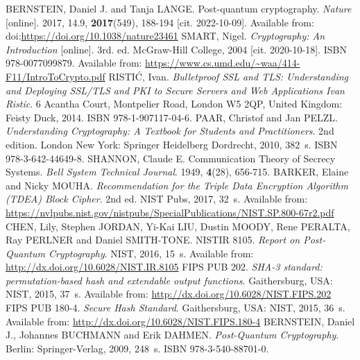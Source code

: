 

\begin{thebibliography}{99}
  BERNSTEIN, Daniel J. and Tanja LANGE. Post-quantum cryptography. \textit{Nature} [online]. 2017, 14.9, \textbf{2017}(549), 188-194 [cit. 2022-10-09]. Available from: doi:\url{https://doi.org/10.1038/nature23461}
  SMART, Nigel. \textit{Cryptography: An Introduction} [online]. 3rd. ed. McGraw-Hill College, 2004 [cit. 2020-10-18]. ISBN 978-0077099879. Available from: \url{https://www.cs.umd.edu/~waa/414-F11/IntroToCrypto.pdf}
  RISTIĆ, Ivan. \textit{Bulletproof SSL and TLS: Understanding and Deploying SSL/TLS and PKI to Secure Servers and Web Applications Ivan Ristic}. 6 Acantha Court, Montpelier Road, London W5 2QP, United Kingdom: Feisty Duck, 2014. ISBN 978-1-907117-04-6.
  PAAR, Christof and Jan PELZL. \textit{Understanding Cryptography: A Textbook for Students and Practitioners}. 2nd edition. London New York: Springer Heidelberg Dordrecht, 2010, 382~s. ISBN 978-3-642-44649-8.
  SHANNON, Claude E. Communication Theory of Secrecy Systems. \textit{Bell System Technical Journal}. 1949, \textbf{4}(28), 656-715.
  BARKER, Elaine and Nicky MOUHA. \textit{Recommendation for the Triple Data Encryption Algorithm (TDEA) Block Cipher}. 2nd ed. NIST Pubs, 2017, 32~s. Available from: \url{https://nvlpubs.nist.gov/nistpubs/SpecialPublications/NIST.SP.800-67r2.pdf}
  CHEN, Lily, Stephen JORDAN, Yi-Kai LIU, Dustin MOODY, Rene PERALTA, Ray PERLNER and Daniel SMITH-TONE. NISTIR 8105. \textit{Report on Post-Quantum Cryptography}. NIST, 2016, 15~s. Available from: \url{http://dx.doi.org/10.6028/NIST.IR.8105}
  FIPS PUB 202. \textit{SHA-3 standard: permutation-based hash and extendable output functions}. Gaithersburg, USA: NIST, 2015, 37~s. Available from: \url{http://dx.doi.org/10.6028/NIST.FIPS.202}
  FIPS PUB 180-4. \textit{Secure Hash Standard}. Gaithersburg, USA: NIST, 2015, 36~s. Available from: \url{http://dx.doi.org/10.6028/NIST.FIPS.180-4}
  BERNSTEIN, Daniel J., Johannes BUCHMANN and Erik DAHMEN. \textit{Post-Quantum Cryptography}. Berlin: Springer-Verlag, 2009, 248~s. ISBN 978-3-540-88701-0.

\end{thebibliography}
